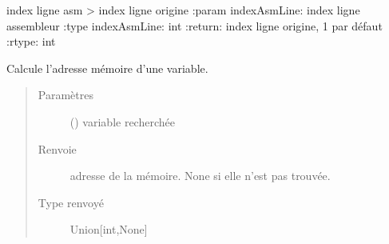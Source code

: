 \documentclass[letterpaper,10pt,french]{sphinxmanual}
\begin{document}
\begin{fulllineitems}

\begin{fulllineitems}
\label{\detokenize{assembleurcontainer:assembleurcontainer.AssembleurContainer.getLineNumber}}
index ligne asm \sphinxhyphen{}\textgreater{} index ligne origine
:param indexAsmLine: index ligne assembleur
:type indexAsmLine: int
:return: index ligne origine, \sphinxhyphen{}1 par défaut
:rtype: int

\end{fulllineitems}


\begin{fulllineitems}
\label{\detokenize{assembleurcontainer:assembleurcontainer.AssembleurContainer.getMemAbsPos}}
Calcule l’adresse mémoire d’une variable.
\begin{quote}\begin{description}
\item[{Paramètres}] \leavevmode
{} ({\hyperref[\detokenize{variable:variable.Variable}]{}}) \textendash{} variable recherchée

\item[{Renvoie}] \leavevmode
adresse de la mémoire. None si elle n’est pas trouvée.

\item[{Type renvoyé}] \leavevmode
Union{[}int,None{]}

\end{description}\end{quote}

\end{fulllineitems}



\end{fulllineitems}
\end{document}
